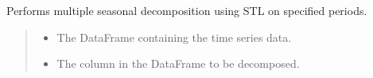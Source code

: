 \documentclass[letterpaper,10pt,english]{sphinxmanual}
\begin{document}

\begin{fulllineitems}
\label{\detokenize{docs/time_series_analysis:time_series_analysis.multiple_STL}}
\pysigstartsignatures
{}
\pysigstopsignatures
\sphinxAtStartPar
Performs multiple seasonal decomposition using STL on specified periods.
\begin{quote}\begin{description}
\begin{itemize}
\item {} 
\sphinxAtStartPar
{} \textendash{} The DataFrame containing the time series data.

\item {} 
\sphinxAtStartPar
{} \textendash{} The column in the DataFrame to be decomposed.

\end{itemize}

\end{description}\end{quote}

\end{fulllineitems}

\end{document}

